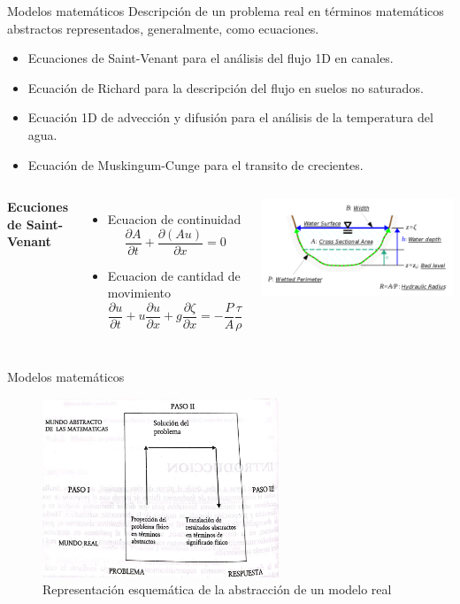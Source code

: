 \documentclass[
10pt,
aspectratio=169,
]{beamer}
\begin{document}
\begin{frame}{Modelos matem\'aticos}
Descripción de un problema real en términos matemáticos abstractos representados, generalmente, como ecuaciones.
\begin{itemize}
\item Ecuaciones de Saint-Venant para el análisis del flujo 1D en canales.
\item Ecuaci\'on de Richard para la descripción del flujo en suelos no saturados.
\item Ecuación 1D de advección y difusión para el análisis de la temperatura del agua.
\item Ecuación de Muskingum-Cunge para el transito de crecientes.
\end{itemize}
\begin{columns}
\textbf{Ecuciones de Saint-Venant}
\begin{itemize}
\item Ecuacion de continuidad
$$
\frac{\partial A}{\partial t} + \frac{\partial (Au)}{\partial x} = 0
$$
\item Ecuacion de cantidad de movimiento
$$
\frac{\partial u}{\partial t} + u\frac{\partial u}{\partial x} + g\frac{\partial \zeta}{\partial x}= -\frac{P}{A}\frac{\tau}{\rho} 
$$
\end{itemize}
\centering
\includegraphics[width=\textwidth]{f2mod.png}
\end{columns}
\end{frame}

\begin{frame}{Modelos matem\'aticos}
\vspace{-0.20cm}
\begin{figure}
\centering
\includegraphics[width=0.63\textwidth]{f1amod.jpeg}
\caption{Representaci\'on esquemática de la abstracción de un modelo real}
\end{figure}
\end{frame}
\end{document}
